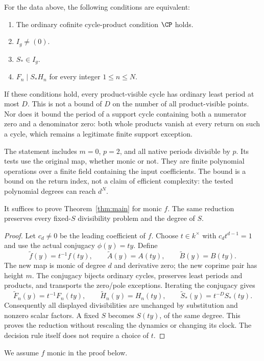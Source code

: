 \begin{samepage}
\begin{theorem}\label{thm:main}
For the data above, the following conditions are equivalent:
\begin{enumerate}
\item The ordinary cofinite cycle-product condition $\CP$ holds.
\item $I_g\ne(0)$.
\item $S_*\in I_g$.
\item $F_n\mid S_*H_n$ for every integer $1\le n\le N$.
\end{enumerate}
If these conditions hold, every product-visible cycle has ordinary
least period at most $D$. This is not a bound of $D$ on the number
of all product-visible points. Nor does it bound the period of a
support cycle containing both a numerator zero and a denominator
zero: both whole products vanish at every return on such a cycle,
which remains a legitimate finite support exception.
\end{theorem}
\end{samepage}

The statement includes $m=0$, $p=2$, and all native periods divisible
by $p$. Its tests use the original map, whether monic or not. They
are finite polynomial operations over a finite field containing the
input coefficients. The bound is a bound on the return index, not
a claim of efficient complexity: the tested polynomial degrees can
reach $d^N$.

\begin{lemma}\label{lem:monic}
It suffices to prove Theorem~\ref{thm:main} for monic $f$.
The same reduction preserves every fixed-$S$ divisibility problem
and the degree of $S$.
\end{lemma}
\begin{proof}
Let $c_d\ne0$ be the leading coefficient of $f$. Choose
$t\in k^\times$ with $c_dt^{d-1}=1$ and use the actual conjugacy
$\phi(y)=ty$. Define
\[
 \widetilde f(y)=t^{-1}f(ty),\qquad
 \widetilde A(y)=A(ty),\qquad \widetilde B(y)=B(ty).
\]
The new map is monic of degree $d$ and derivative zero; the new
coprime pair has height $m$. The conjugacy bijects ordinary cycles,
preserves least periods and products, and transports the zero/pole
exceptions. Iterating the conjugacy gives
\begin{equation}\label{eq:conjugacy}
 \widetilde F_n(y)=t^{-1}F_n(ty),\qquad
 \widetilde H_n(y)=H_n(ty),\qquad
 \widetilde S_*(y)=t^{-D}S_*(ty).
\end{equation}
Consequently all displayed divisibilities are unchanged by
substitution and nonzero scalar factors. A fixed $S$ becomes
$S(ty)$, of the same degree. This proves the reduction without
rescaling the dynamics or changing its clock. The decision rule
itself does not require a choice of $t$.
\end{proof}

We assume $f$ monic in the proof below.
